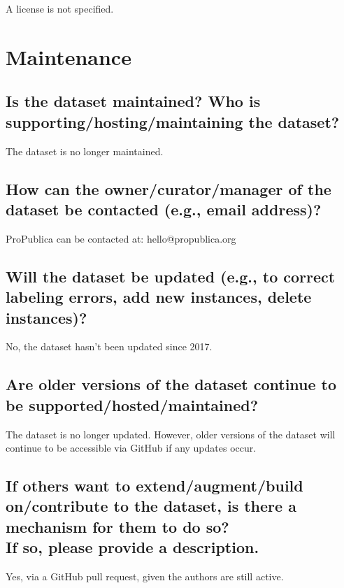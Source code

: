 \documentclass[letterpaper, 10 pt, conference]{ieeeconf}  %
\newcommand{\subtitle}[1]{{\\ \small \normalfont \color{purple} #1}}
\begin{document}
A license is not specified.


\section{Maintenance}

\subsection{Is the dataset maintained? Who is supporting/hosting/maintaining the dataset?}

The dataset is no longer maintained.

\subsection{How can the owner/curator/manager of the dataset be contacted (e.g., email address)?}

ProPublica can be contacted at: hello@propublica.org

\subsection{Will the dataset be updated (e.g., to correct labeling errors, add new instances, delete instances)?}

No, the dataset hasn't been updated since 2017.

\subsection{Are older versions of the dataset continue to be supported/hosted/maintained?}

The dataset is no longer updated. However, older versions of the dataset will continue to be accessible via GitHub if any updates occur.

\subsection{If others want to extend/augment/build on/contribute to the dataset, is there a mechanism for them to do so? \subtitle{If so, please provide a description.}}

Yes, via a GitHub pull request, given the authors are still active.

\medskip
 
  

\end{document}
